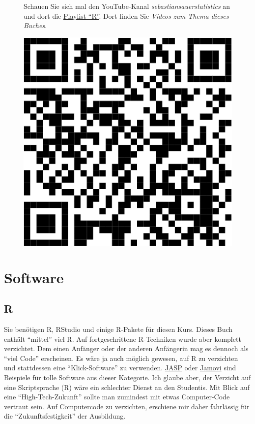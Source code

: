 \documentclass[
  letterpaper,
  twoside,
  open=any]{scrbook}
\theoremstyle{definition}
\theoremstyle{definition}
\theoremstyle{definition}
\theoremstyle{remark}
\begin{document}
\begin{figure}

\begin{minipage}{0.80\linewidth}
Schauen Sie sich mal den YouTube-Kanal \emph{sebastiansauerstatistics}
an und dort die
\href{https://www.youtube.com/playlist?list=PLRR4REmBgpIEaIyeNBgNGPgmhQJ_T1y8_}{Playlist
\enquote{R}}. Dort finden Sie \emph{Videos zum Thema dieses
Buches}.\end{minipage}%
%
\begin{minipage}{0.20\linewidth}

\begin{center}
\includegraphics[width=0.75\linewidth,height=\textheight,keepaspectratio]{005-orga_files/figure-pdf/unnamed-chunk-5-1.pdf}
\end{center}

\end{minipage}%

\end{figure}%

\section{Software}\label{software}

\subsection{R}\label{r}

Sie benötigen R, RStudio und einige R-Pakete für diesen Kurs. Dieses
Buch enthält \enquote{mittel} viel R. Auf fortgeschrittene R-Techniken
wurde aber komplett verzichtet. Dem einen Anfänger oder der anderen
Anfängerin mag es dennoch als \enquote{viel Code} erscheinen. Es wäre ja
auch möglich gewesen, auf R zu verzichten und stattdessen eine
\enquote{Klick-Software} zu verwenden.
\href{https://jasp-stats.org/}{JASP} oder
\href{https://www.jamovi.org/}{Jamovi} sind Beispiele für tolle Software
aus dieser Kategorie. Ich glaube aber, der Verzicht auf eine
Skriptsprache (R) wäre ein schlechter Dienst an den Studentis. Mit Blick
auf eine \enquote{High-Tech-Zukunft} sollte man zumindest mit etwas
Computer-Code vertraut sein. Auf Computercode zu verzichten, erschiene
mir daher fahrlässig für die \enquote{Zukunftsfestigkeit} der
Ausbildung.
\end{document}
